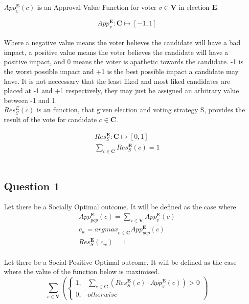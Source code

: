 \documentclass{article}
\begin{document}
$App^{\pmb{E}}_{v}(c)$ is an Approval Value Function for voter $v \in \pmb{V}$ in election $\pmb{E}$.

\begin{equation*}
App^{\pmb{E}}_{v} : \pmb{C} \mapsto [-1,1]
\end{equation*}\\

Where a negative value means the voter believes the candidate will have a bad impact, a positive value means the voter believes the candidate will have a positive impact, and 0 means the voter is apathetic towards the candidate. -1 is the worst possible impact and +1 is the best possible impact a candidate may have. It is not neccessary that the least liked and most liked candidates are placed at -1 and +1 respectively, they may just be assigned an arbitrary value between -1 and 1.\\

$Res^{E}_{S}(c)$ is an function, that given election  and voting strategy {S}, provides the result of the vote for candidate $c \in \pmb{C}$.

\begin{gather}
Res^{\pmb{E}}_{S} : \pmb{C} \mapsto [0,1]\\
\sum^{}_{c \in \pmb{C}}{Res^{\pmb{E}}_{S}(c)} = 1
\end{gather}\\

\subsection{Question 1}

Let there be a Socially Optimal outcome. It will be defined as the case where
\begin{gather}
App^{\pmb{E}}_{pop}(c) = \sum^{}_{v \in \pmb{V}}{App^{\pmb{E}}_{v}(c)}\\
c_{w} = {argmax}_{c \in \pmb{C}} App^{\pmb{E}}_{pop}(c)\\
Res^{\pmb{E}}_{S}(c_{w}) = 1
\end{gather}\\

Let there be a Social-Positive Optimal outcome. It will be defined as the case where the value of the function below is maximised.
\begin{equation}
\sum^{}_{v \in \pmb{V}}{\left(
\begin{cases}
1, & \sum^{}_{c \in \pmb{C}}{(Res^{\pmb{E}}_{S}(c) \cdot App^{\pmb{E}}_{v}(c))} > 0\\
0, & {otherwise}
\end{cases}
\right)}
\end{equation}\\
\end{document}
